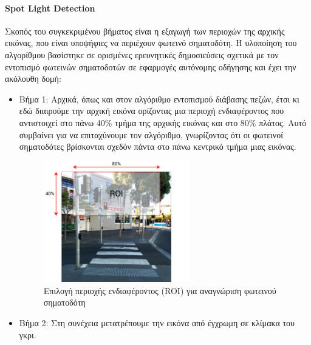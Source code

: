 \paragraph{Spot Light Detection}
Σκοπός του συγκεκριμένου βήματος είναι η εξαγωγή των περιοχών της αρχικής εικόνας, που είναι υποψήφιες να περιέχουν φωτεινό σηματοδότη. Η υλοποίηση του αλγορίθμου βασίστηκε σε ορισμένες ερευνητικές δημοσιεύσεις σχετικά με τον εντοπισμό φωτεινών σηματοδοτών σε εφαρμογές αυτόνομης οδήγησης \cite{de2009real, tae2006detection} και έχει την ακόλουθη δομή:
\begin{itemize}
    \item Βήμα 1: Αρχικά, όπως και στον αλγόριθμο εντοπισμού διάβασης πεζών, έτσι κι εδώ διαιρούμε την αρχική εικόνα ορίζοντας μια περιοχή ενδιαφέροντος που αντιστοιχεί στο πάνω 40\% τμήμα της αρχικής εικόνας και στο 80\% πλάτος. Αυτό συμβαίνει για να επιταχύνουμε τον αλγόριθμο, γνωρίζοντας ότι οι φωτεινοί σηματοδότες βρίσκονται σχεδόν πάντα στο πάνω κεντρικό τμήμα μιας εικόνας.
    \begin{figure}[H]
        \centering
        \includegraphics[width=0.6\textwidth]{images/upper_roi.png}
        \caption{Επιλογή περιοχής ενδιαφέροντος (ROI) για αναγνώριση φωτεινού σηματοδότη}
        \label{fig:upper-roi}
    \end{figure}
    \item Βήμα 2: Στη συνέχεια μετατρέπουμε την εικόνα από έγχρωμη σε κλίμακα του γκρι.

\end{itemize}
